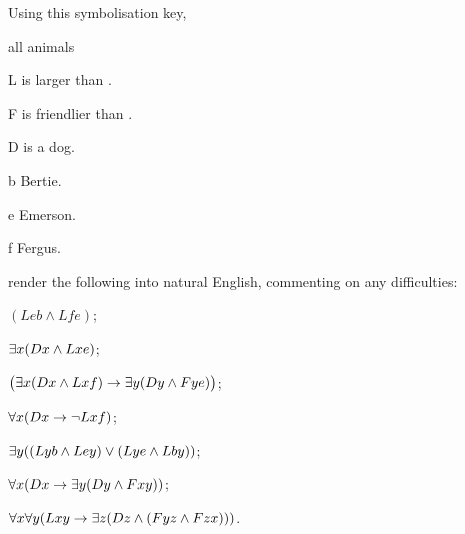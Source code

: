 \problempart
Using this symbolisation key, 
\begin{ekey}
	\item[\text{domain}] all animals
	\item[L]  is larger than .
	\item[F]  is friendlier than .
	\item[D]  is a dog.
	\item[b] Bertie.
	\item[e] Emerson.
	\item[f] Fergus.
\end{ekey}
render the following into natural English, commenting on any difficulties:
\begin{earg}
	\item $(Leb \wedge Lfe)$;
	\item $\exists x (Dx \wedge Lxe)$;
	\item $\bigl(\exists x (Dx \wedge Lxf) \rightarrow \exists y (Dy \wedge Fye)\bigr)$;
	\item $\forall x (Dx \rightarrow \neg Lxf)$;
	\item $\exists y ((Lyb \wedge Ley) \vee (Lye \wedge Lby))$;
	\item $\forall x (Dx \rightarrow \exists y (Dy \wedge Fxy))$;
	\item $\forall x \forall y (Lxy \rightarrow \exists z (Dz \wedge (Fyz \wedge Fzx)))$.
\end{earg}

